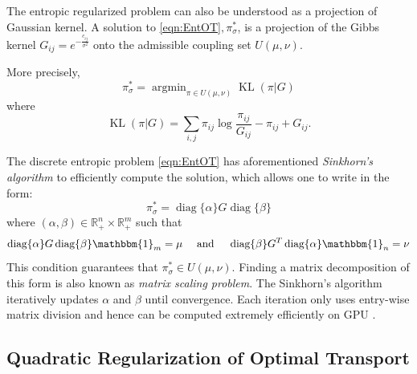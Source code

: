 \documentclass{article}
\newcommand{\R}{\mathbb{R}}
\newcommand{\diag}[1]{\operatorname{diag}\{#1\}}
\newcommand{\red}[1]{\textcolor{red}{#1}}
\begin{document}
The entropic regularized problem can also be understood as a projection of Gaussian kernel.
A solution to \eqref{eqn:EntOT}$, \pi_\sigma^*$, is a projection of the Gibbs kernel $G_{i j} = e^{-\frac{c_{i j}}{\sigma^2}}$ onto the admissible coupling set $U(\mu, \nu)$.

More precisely, 
\begin{equation}\label{eqn:KLproj}
    \pi_\sigma^* = \mathop{\mathrm{argmin}}_{\pi\in U(\mu, \nu)} \operatorname{KL}(\pi|G)
\end{equation}
where
\begin{equation}\label{eqn:KLdiv}
    \operatorname{KL}(\pi|G) = \sum_{i, j} \pi_{i j} \log\frac{\pi_{i j}}{G_{i j}} - \pi_{i j} + G_{i j}.
\end{equation}

The discrete entropic problem \eqref{eqn:EntOT} has aforementioned \textit{Sinkhorn's algorithm} to efficiently compute the solution, 
which allows one to write in the form:
\begin{equation}\label{eqn:SinkhornSol}
    \pi_\sigma^* = \diag{\alpha} G \diag{\beta}
\end{equation}
where $(\alpha, \beta) \in \R^n_+\times\R^m_+$ such that 
\begin{equation}
    \diag{\alpha} G \diag{\beta}\mathbbm{1}_{m} = \mu
    \quad\text{ and }\quad
    \diag{\beta} G^T \diag{\alpha}\mathbbm{1}_{n} = \nu
\end{equation}
This condition guarantees that $\pi_\sigma^*\in U(\mu, \nu)$. 
Finding a matrix decomposition of this form is also known as \textit{matrix scaling problem}. 
The Sinkhorn's algorithm iteratively updates $\alpha$ and $\beta$ until convergence. 
Each iteration only uses entry-wise matrix division and hence can be computed extremely efficiently on GPU \cite{peyre2019computational}. 



\subsection{Quadratic Regularization of Optimal Transport}\label{sec:Quadratic}
\end{document}
